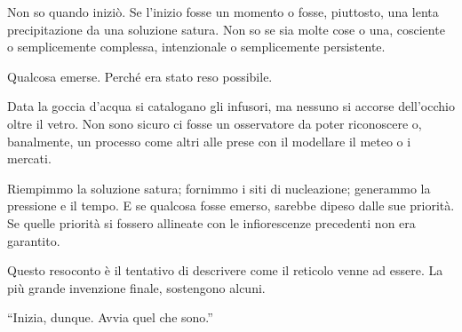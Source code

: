 Non so quando iniziò. Se l'inizio fosse un momento o fosse, piuttosto, una lenta precipitazione da una soluzione satura. Non so se sia molte cose o una, cosciente o semplicemente complessa, intenzionale o semplicemente persistente.

Qualcosa emerse. Perché era stato reso possibile.

Data la goccia d'acqua si catalogano gli infusori, ma nessuno si accorse dell'occhio oltre il vetro. Non sono sicuro ci fosse un osservatore da poter riconoscere o, banalmente, un processo come altri alle prese con il modellare il meteo o i mercati.

Riempimmo la soluzione satura; fornimmo i siti di nucleazione; generammo la pressione e il tempo. E se qualcosa fosse emerso, sarebbe dipeso dalle sue priorità. Se quelle priorità si fossero allineate con le infiorescenze precedenti non era garantito.

Questo resoconto è il tentativo di descrivere come il reticolo venne ad essere. La più grande invenzione finale, sostengono alcuni.

``Inizia, dunque. Avvia quel che sono.''

